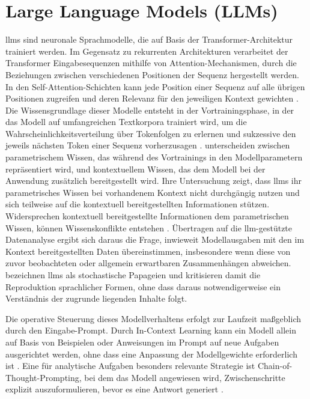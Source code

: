 \section{Large Language Models (LLMs)}
\label{sec:llm}
\glspl{llm} sind neuronale Sprachmodelle, die auf Basis der Transformer-Architektur trainiert werden. Im Gegensatz zu rekurrenten Architekturen verarbeitet der Transformer Eingabesequenzen mithilfe von Attention-Mechanismen, durch die Beziehungen zwischen verschiedenen Positionen der Sequenz hergestellt werden. In den Self-Attention-Schichten kann jede Position einer Sequenz auf alle übrigen Positionen zugreifen und deren Relevanz für den jeweiligen Kontext gewichten \parencite{vaswani_attention_2017}. Die Wissensgrundlage dieser Modelle entsteht in der Vortrainingsphase, in der das Modell auf umfangreichen Textkorpora trainiert wird, um die Wahrscheinlichkeitsverteilung über Tokenfolgen zu erlernen und sukzessive den jeweils nächsten Token einer Sequenz vorherzusagen \parencite{brown_language_2020}. \textcite{cheng_understanding_2024} unterscheiden zwischen parametrischem Wissen, das während des Vortrainings in den Modellparametern repräsentiert wird, und kontextuellem Wissen, das dem Modell bei der Anwendung zusätzlich bereitgestellt wird. Ihre Untersuchung zeigt, dass \glspl{llm} ihr parametrisches Wissen bei vorhandenem Kontext nicht durchgängig nutzen und sich teilweise auf die kontextuell bereitgestellten Informationen stützen. Widersprechen kontextuell bereitgestellte Informationen dem parametrischen Wissen, können Wissenskonflikte entstehen \parencite{yuan_discerning_2024}. Übertragen auf die \gls{llm}-gestützte Datenanalyse ergibt sich daraus die Frage, inwieweit Modellausgaben mit den im Kontext bereitgestellten Daten übereinstimmen, insbesondere wenn diese von zuvor beobachteten oder allgemein erwartbaren Zusammenhängen abweichen. \textcite{bender_dangers_2021} bezeichnen \glspl{llm} als stochastische Papageien und kritisieren damit die Reproduktion sprachlicher Formen, ohne dass daraus notwendigerweise ein Verständnis der zugrunde liegenden Inhalte folgt.

Die operative Steuerung dieses Modellverhaltens erfolgt zur Laufzeit maßgeblich durch den Eingabe-Prompt. Durch In-Context Learning kann ein Modell allein auf Basis von Beispielen oder Anweisungen im Prompt auf neue Aufgaben ausgerichtet werden, ohne dass eine Anpassung der Modellgewichte erforderlich ist \parencite{brown_language_2020}. Eine für analytische Aufgaben besonders relevante Strategie ist Chain-of-Thought-Prompting, bei dem das Modell angewiesen wird, Zwischenschritte explizit auszuformulieren, bevor es eine Antwort generiert \parencite{wei_chain--thought_2023}.

